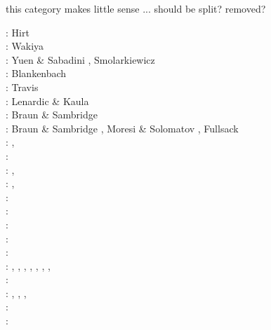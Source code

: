 {\color{red} this category makes little sense ... should be split? removed? }

\begin{scriptsize}
\nineteenseventyfour: Hirt \etal \cite{hiac74}\\
\nineteenseventyfive: Wakiya \cite{waki75a,waki75b}\\
\nineteeneightyfour: Yuen \& Sabadini \cite{yusa84}, Smolarkiewicz \cite{smol84}\\
\nineteeneightynine: Blankenbach \etal \cite{blbc89}\\
\nineteenninety: Travis \etal \cite{trab90}\\
\nineteenninetythree: Lenardic \& Kaula \cite{leka93}\\
\nineteenninetyfour: Braun \& Sambridge \cite{brsa94}\\
\nineteenninetyfive: Braun \& Sambridge \cite{brsa95}, Moresi \& Solomatov \cite{moso95}, 
                     Fullsack \cite{full95}\\
\nineteenninetysix: \cite{zhon96}, \cite{mozg96}\\
\nineteenninetyseven: \cite{rist97}\\
\nineteenninetynine: \cite{lind99}, \cite{bird99}\\
\twothousandone: \cite{modm01}, \cite{vank01}\\
\twothousandtwo: \cite{mudm02}\\
\twothousandthree: \cite{taki03}\cite{modm03}\cite{geyu03}\cite{geyu03b}\cite{taxi03}\cite{scpo03}\\
\twothousandfour: \cite{kaps04}\cite{kasa04}\cite{kaks08}\cite{mumc04}\\
\twothousandfive: \cite{mure05}\\
\twothousandsix: \cite{kapo06}\cite{more06}\cite{onmm06}\cite{mudm06}\cite{tact06}\\
\twothousandseven: 
\cite{toma07},
\cite{chcc07},
\cite{kabe07},
\cite{kaks07},
\cite{moql07},
\cite{geyu07},
\cite{dadh07},
\cite{zldf07}\\
\twothousandeight: \cite{zhmt08}\cite{deka08}\cite{trub08}\cite{krdp08}\cite{mamo08}\cite{gepd98}
      \cite{vack08}\cite{heta08}\cite{brtf08}\cite{daks08}\cite{chzy08}\cite{tack08}\cite{hust08b}\\
\twothousandnine: \cite{king09}, \cite{geum09}, \cite{vemm09}, 
                  \cite{qurj09}\\
\twothousandten: \cite{kaus10}\cite{kamm10}\cite{egat10}\cite{kilv10}\\
\twothousandeleven: \cite{dumg11}\cite{uibb11}\cite{hegc11}\cite{muso11}\cite{dawk11}\cite{lemm11}\\

\end{scriptsize}
